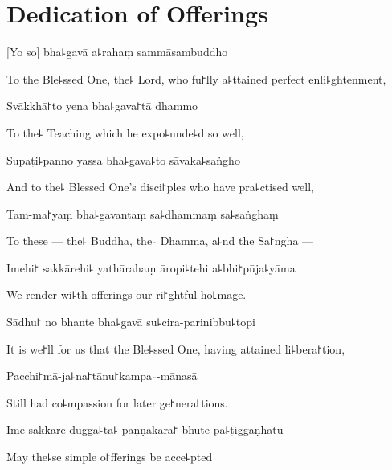 
\chapter{Dedication of Offerings}                   %

[Yo so] bha꜕gavā a꜕rahaṃ sammāsambuddho

\begin{english}
To the Ble꜕ssed One, the꜕ Lord, who fu꜓lly a꜕ttained perfect enli꜕ghtenment,
\end{english}

Svākkhā꜓to yena bha꜕gava꜓tā dhammo

\begin{english}
To the꜕ Teaching which he expo꜕unde꜕d so well,
\end{english}

Supaṭi꜕panno yassa bha꜕gava꜕to sāvaka꜕saṅgho

\begin{english}
And to the꜕ Blessed One's disci꜓ples who have pra꜕ctised well,
\end{english}

Tam-ma꜓yaṃ bha꜕gavantaṃ sa꜕dhammaṃ sa꜕saṅghaṃ

\begin{english}
To these --- the꜕ Buddha, the꜕ Dhamma, a꜕nd the Sa꜓ngha ---
\end{english}

Imehi꜓ sakkārehi꜕ yathārahaṃ āropi꜕tehi a꜕bhi꜓pūja꜕yāma

\begin{english}
We render wi꜕th offerings our ri꜓ghtful ho꜖mage.
\end{english}

Sādhu꜓ no bhante bha꜕gavā su꜕cira-parinibbu꜕topi

\begin{english}
It is we꜓ll for us that the Ble꜕ssed One, having attained li꜕bera꜓tion,
\end{english}

Pacchi꜓mā-ja꜕na꜓tānu꜓kampa꜕-mānasā

\begin{english}
Still had co꜕mpassion for later ge꜓nera꜖tions.
\end{english}

Ime sakkāre dugga꜕ta꜕-paṇṇākāra꜓-bhūte pa꜕ṭiggaṇhātu

\begin{english}
May the꜕se simple o꜓fferings be acce꜕pted
\end{english}

